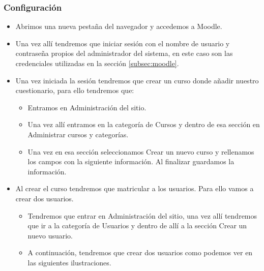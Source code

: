 \subsubsection{Configuración}


\begin{itemize}

	\item Abrimos una nueva pestaña del navegador y accedemos a Moodle.
	
	\item Una vez allí tendremos que iniciar sesión con el nombre de usuario y contraseña propios del administrador del sistema, en este caso son las credenciales utilizadas en la sección \ref{subsec:moodle}. 
	
	\item Una vez iniciada la sesión tendremos que crear un curso donde añadir nuestro cuestionario, para ello tendremos que:
	
	\begin{itemize}
	
		\item Entramos en Administración del sitio.
		
		\item Una vez allí entramos en la categoría de Cursos y dentro de esa sección en Administrar cursos y categorías. 
		
		\item Una vez en esa sección seleccionamos Crear un nuevo curso y rellenamos los campos con la siguiente información. Al finalizar guardamos la información.
	\end{itemize}
	
	\item Al crear el curso tendremos que matricular a los usuarios. Para ello vamos a crear dos usuarios.
	
	\begin{itemize}
		
		\item Tendremos que entrar en Administración del sitio, una vez allí tendremos que ir a la categoría de Usuarios y dentro de allí a la sección Crear un nuevo usuario. 
		
		\item A continuación, tendremos que crear dos usuarios como podemos ver en las siguientes ilustraciones.  
	\end{itemize}
	

\end{itemize}
